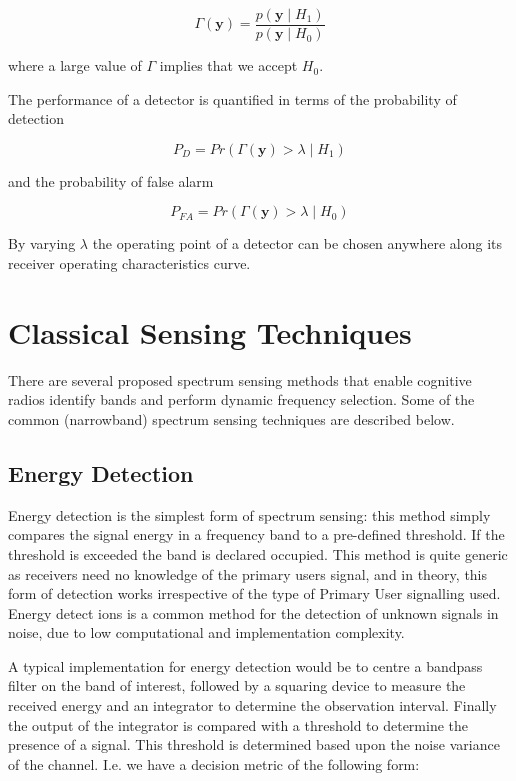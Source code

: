 \begin{equation}
\Gamma\left(\textbf{y}\right) = \frac{p\left(\textbf{y}\mid H_1\right)}{p\left(\textbf{y}\mid H_0\right)}
\end{equation}
\label{likeratio}

where a large value of \(\Gamma\) implies that we accept \(H_0\).

The performance of a detector is quantified in terms of the probability of detection

\begin{equation}
P_{D} = Pr\left( \Gamma\left(\textbf{y}\right) > \lambda \mid H_1\right)
\end{equation}

and the probability of false alarm 

\begin{equation}
P_{FA} = Pr\left( \Gamma\left(\textbf{y}\right) > \lambda \mid H_0\right)
\end{equation}

By varying \(\lambda\) the operating point of a detector can be chosen anywhere along its receiver operating characteristics curve.

\section{Classical Sensing Techniques} \label{sec:techniques}

There are several proposed spectrum sensing methods that enable cognitive radios identify bands and perform dynamic frequency selection. Some of the common (narrowband) spectrum sensing techniques are described below.

\subsection{Energy Detection}\label{sec:energy-detection}

Energy detection is the simplest form of spectrum sensing: this method simply compares the signal energy in a frequency band to a pre-defined threshold. If the threshold is exceeded the band is declared occupied. This method is quite generic as receivers need no knowledge of the primary users signal, and in theory, this form of detection works irrespective of the type of Primary User signalling used. Energy detect ions is a common method for the detection of unknown signals in noise, due to low computational and implementation complexity. 

A typical implementation for energy detection would be to centre a bandpass filter on the band of interest, followed by a squaring device to measure the received energy and an integrator to determine the observation interval. Finally the output of the integrator is compared with a threshold to determine the presence of a signal. This threshold is determined based upon the noise variance of the channel. I.e. we have a decision metric of the following form:

